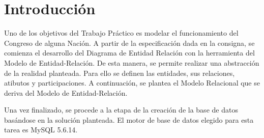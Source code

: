 \section{Introducción}
Uno de los objetivos del Trabajo Práctico es modelar el funcionamiento del Congreso de alguna Nación.
A partir de la especificación dada en la consigna, se comienza el desarrollo del Diagrama de Entidad Relación con la herramienta del Modelo de Entidad-Relación. De esta manera, se permite realizar una abstracción de la realidad planteada. Para ello se definen las entidades, sus relaciones, atibutos y participaciones. 
A continuación, se plantea el Modelo Relacional que se deriva del Modelo de Entidad-Relación. 


Una vez finalizado, se procede a la etapa de la creación de la base de datos basándose en la solución planteada. El motor de base de datos elegido para esta tarea es MySQL 5.6.14.

